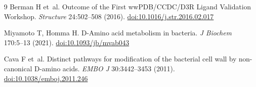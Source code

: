 \documentclass[11pt]{article}
\begin{document}
\begin{thebibliography}{9}
Berman H et~al.
\newblock Outcome of the First wwPDB/CCDC/D3R Ligand Validation Workshop.
\newblock \textit{Structure} 24:502--508 (2016).
\newblock \href{https://doi.org/10.1016/j.str.2016.02.017}{doi:10.1016/j.str.2016.02.017}

Miyamoto T, Homma H.
\newblock D-Amino acid metabolism in bacteria.
\newblock \textit{J Biochem} 170:5--13 (2021).
\newblock \href{https://doi.org/10.1093/jb/mvab043}{doi:10.1093/jb/mvab043}

Cava F et~al.
\newblock Distinct pathways for modification of the bacterial cell wall by non-canonical D-amino acids.
\newblock \textit{EMBO J} 30:3442--3453 (2011).
\newblock \href{https://doi.org/10.1038/emboj.2011.246}{doi:10.1038/emboj.2011.246}

\end{thebibliography}
\end{document}
